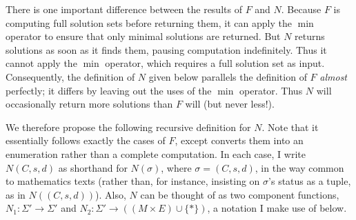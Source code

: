 \documentclass{article}
\begin{document}
There is one important difference between the results of $F$ and $N$.  Because $F$ is computing full solution sets before returning them, it can apply the $\min$ operator to ensure that only minimal solutions are returned.  But $N$ returns solutions as soon as it finds them, pausing computation indefinitely.  Thus it cannot apply the $\min$ operator, which requires a full solution set as input.  Consequently, the definition of $N$ given below parallels the definition of $F$ \emph{almost} perfectly; it differs by leaving out the uses of the $\min$ operator.  Thus $N$ will occasionally return more solutions than $F$ will (but never less!).

We therefore propose the following recursive definition for $N$.  Note that it essentially follows exactly the cases of $F$, except converts them into an enumeration rather than a complete computation.  In each case, I write $N(C,s,d)$ as shorthand for $N(\sigma)$, where $\sigma=(C,s,d)$, in the way common to mathematics texts (rather than, for instance, insisting on $\sigma$'s status as a tuple, as in $N((C,s,d))$).  Also, $N$ can be thought of as two component functions, $N_1:\Sigma'\to\Sigma'$ and $N_2:\Sigma'\to((M\times E)\cup\{*\})$, a notation I make use of below.
\end{document}

